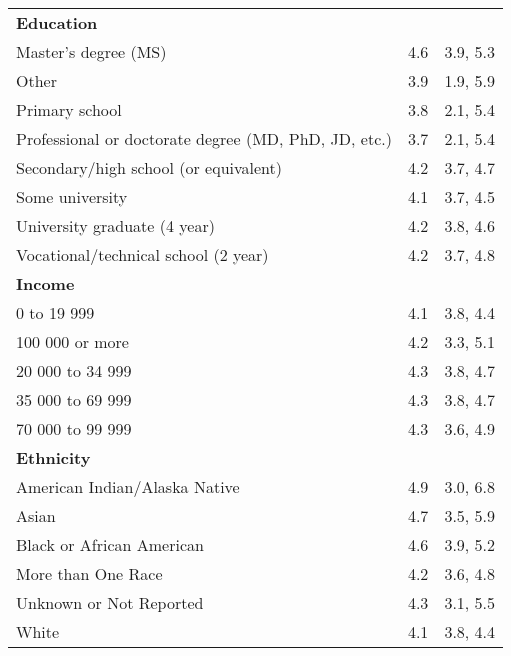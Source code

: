 \begin{longtable}{lcc}
\textbf{Education} &  & \\
\hspace{1em}Master's degree (MS) & 4.6 & 3.9, 5.3\\
\hspace{1em}Other & 3.9 & 1.9, 5.9\\
\hspace{1em}Primary school & 3.8 & 2.1, 5.4\\
\hspace{1em}Professional or doctorate degree (MD, PhD, JD, etc.) & 3.7 & 2.1, 5.4\\
\hspace{1em}Secondary/high school (or equivalent) & 4.2 & 3.7, 4.7\\
\hspace{1em}Some university & 4.1 & 3.7, 4.5\\
\hspace{1em}University graduate (4 year) & 4.2 & 3.8, 4.6\\
\hspace{1em}Vocational/technical school (2 year) & 4.2 & 3.7, 4.8\\

\textbf{Income} &  & \\
\hspace{1em}0 to 19 999 & 4.1 & 3.8, 4.4\\
\hspace{1em}100 000 or more & 4.2 & 3.3, 5.1\\
\hspace{1em}20 000 to 34 999 & 4.3 & 3.8, 4.7\\
\hspace{1em}35 000 to 69 999 & 4.3 & 3.8, 4.7\\
\hspace{1em}70 000 to 99 999 & 4.3 & 3.6, 4.9\\

\textbf{Ethnicity} &  & \\
\hspace{1em}American Indian/Alaska Native & 4.9 & 3.0, 6.8\\
\hspace{1em}Asian & 4.7 & 3.5, 5.9\\
\hspace{1em}Black or African American & 4.6 & 3.9, 5.2\\
\hspace{1em}More than One Race & 4.2 & 3.6, 4.8\\
\hspace{1em}Unknown or Not Reported & 4.3 & 3.1, 5.5\\
\hspace{1em}White & 4.1 & 3.8, 4.4\\


\end{longtable}
